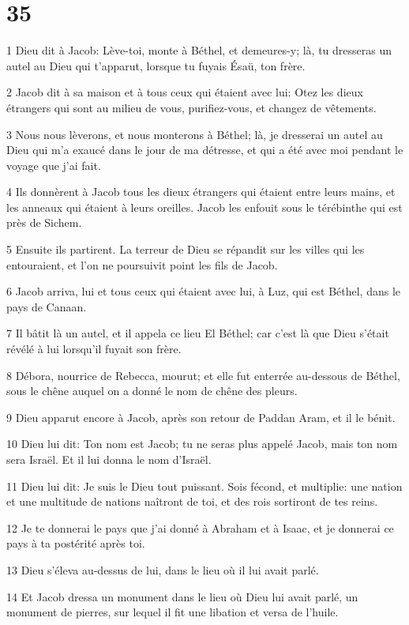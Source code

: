 \chapter{35}

\par 1 Dieu dit à Jacob: Lève-toi, monte à Béthel, et demeures-y; là, tu dresseras un autel au Dieu qui t'apparut, lorsque tu fuyais Ésaü, ton frère.
\par 2 Jacob dit à sa maison et à tous ceux qui étaient avec lui: Otez les dieux étrangers qui sont au milieu de vous, purifiez-vous, et changez de vêtements.
\par 3 Nous nous lèverons, et nous monterons à Béthel; là, je dresserai un autel au Dieu qui m'a exaucé dans le jour de ma détresse, et qui a été avec moi pendant le voyage que j'ai fait.
\par 4 Ils donnèrent à Jacob tous les dieux étrangers qui étaient entre leurs mains, et les anneaux qui étaient à leurs oreilles. Jacob les enfouit sous le térébinthe qui est près de Sichem.
\par 5 Ensuite ils partirent. La terreur de Dieu se répandit sur les villes qui les entouraient, et l'on ne poursuivit point les fils de Jacob.
\par 6 Jacob arriva, lui et tous ceux qui étaient avec lui, à Luz, qui est Béthel, dans le pays de Canaan.
\par 7 Il bâtit là un autel, et il appela ce lieu El Béthel; car c'est là que Dieu s'était révélé à lui lorsqu'il fuyait son frère.
\par 8 Débora, nourrice de Rebecca, mourut; et elle fut enterrée au-dessous de Béthel, sous le chêne auquel on a donné le nom de chêne des pleurs.
\par 9 Dieu apparut encore à Jacob, après son retour de Paddan Aram, et il le bénit.
\par 10 Dieu lui dit: Ton nom est Jacob; tu ne seras plus appelé Jacob, mais ton nom sera Israël. Et il lui donna le nom d'Israël.
\par 11 Dieu lui dit: Je suis le Dieu tout puissant. Sois fécond, et multiplie: une nation et une multitude de nations naîtront de toi, et des rois sortiront de tes reins.
\par 12 Je te donnerai le pays que j'ai donné à Abraham et à Isaac, et je donnerai ce pays à ta postérité après toi.
\par 13 Dieu s'éleva au-dessus de lui, dans le lieu où il lui avait parlé.
\par 14 Et Jacob dressa un monument dans le lieu où Dieu lui avait parlé, un monument de pierres, sur lequel il fit une libation et versa de l'huile.
